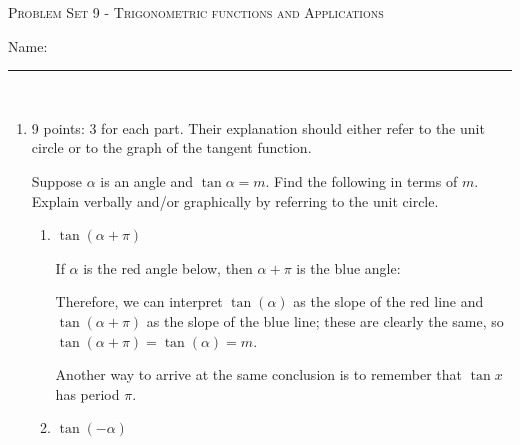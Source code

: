 \documentclass{article}
\begin{document}
\begin{center}
  \large\textsc{Problem Set 9 - Trigonometric functions and Applications}
  
      \pspace{12pt}
  \begin{problemonly}\large Name: \rule{5cm}{0.15mm}\\ \end{problemonly}
\end{center}

\begin{enumerate}

\item 

\begin{grading}
9 points: 3 for each part. Their explanation should either refer to the unit circle or to the graph of the tangent function. 
\end{grading}


  Suppose $\alpha$ is an angle and $\tan \alpha = m$. Find the following in terms of $m$.
  Explain verbally and/or graphically by referring to the unit circle.
  \probonly{}
    \begin{enumerate}
    \item
      \begin{problem}[\vfill]
        $\tan (\alpha + \pi)$
      \end{problem}

      \begin{solution}
        If $\alpha$ is the red angle below, then $\alpha + \pi$ is the
        blue angle: 
        \begin{center}
          \begin{tikzangle}[angle=pi/3, secondangle=4*pi/3]            
          \end{tikzangle}
        \end{center}
        Therefore, we can interpret $\tan(\alpha)$ as the slope of the red
        line and $\tan(\alpha + \pi)$ as the slope of the blue line; these
        are clearly the same, so $\tan(\alpha + \pi) = \tan(\alpha) =
        \boxed{m}$.

        Another way to arrive at the same conclusion is to remember that
        $\tan x$ has period $\pi$. 
      \end{solution}

    \item
      \begin{problem}[\vfill]
        $\tan (-\alpha)$
      \end{problem}


\end{enumerate}
\end{enumerate}
\end{document}
